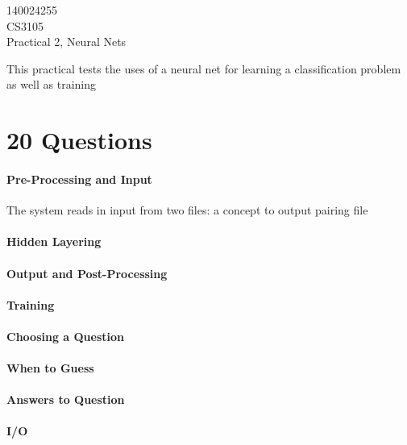 \documentclass[12pt]{article}
\begin{document}
\begin{flushright}
140024255\\
CS3105\\
Practical 2, Neural Nets
\end{flushright}

This practical tests the uses of a neural net for learning a classification problem as well as training

\section{20 Questions}
\paragraph*{Pre-Processing and Input}
The system reads in input from two files: a concept to output pairing file

\paragraph*{Hidden Layering}

\paragraph*{Output and Post-Processing}

\paragraph*{Training}

\paragraph*{Choosing a Question}

\paragraph*{When to Guess}

\paragraph*{Answers to Question}

\paragraph*{I/O}
\end{document}
